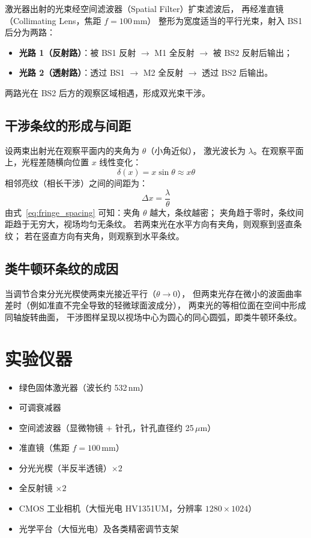 \documentclass[12pt, a4paper]{article}
\begin{document}
激光器出射的光束经空间滤波器（Spatial Filter）扩束滤波后，
再经准直镜（Collimating Lens，焦距 $f = 100\,\text{mm}$）
整形为宽度适当的平行光束，射入 BS1 后分为两路：
\begin{itemize}
  \item \textbf{光路 1（反射路）}：被 BS1 反射 $\to$ M1 全反射
        $\to$ 被 BS2 反射后输出；
  \item \textbf{光路 2（透射路）}：透过 BS1 $\to$ M2 全反射
        $\to$ 透过 BS2 后输出。
\end{itemize}
两路光在 BS2 后方的观察区域相遇，形成双光束干涉。

\subsection{干涉条纹的形成与间距}

设两束出射光在观察平面内的夹角为 $\theta$（小角近似），
激光波长为 $\lambda$。在观察平面上，光程差随横向位置 $x$ 线性变化：
\begin{equation}
  \delta(x) = x\sin\theta \approx x\theta
\end{equation}
相邻亮纹（相长干涉）之间的间距为：
\begin{equation}
  \Delta x = \frac{\lambda}{\theta}
  \label{eq:fringe_spacing}
\end{equation}
由式~\eqref{eq:fringe_spacing} 可知：夹角 $\theta$ 越大，条纹越密；
夹角趋于零时，条纹间距趋于无穷大，视场均匀无条纹。
若两束光在水平方向有夹角，则观察到竖直条纹；
若在竖直方向有夹角，则观察到水平条纹。

\subsection{类牛顿环条纹的成因}

当调节合束分光光楔使两束光接近平行（$\theta \to 0$），
但两束光存在微小的波面曲率差时（例如准直不完全导致的轻微球面波成分），
两束光的等相位面在空间中形成同轴旋转曲面，
干涉图样呈现以视场中心为圆心的同心圆弧，即类牛顿环条纹。

\section{实验仪器}

\begin{itemize}
  \item 绿色固体激光器（波长约 532\,nm）
  \item 可调衰减器
  \item 空间滤波器（显微物镜 + 针孔，针孔直径约 25\,$\mu$m）
  \item 准直镜（焦距 $f = 100\,\text{mm}$）
  \item 分光光楔（半反半透镜）$\times 2$
  \item 全反射镜 $\times 2$
  \item CMOS 工业相机（大恒光电 HV1351UM，分辨率 $1280 \times 1024$）
  \item 光学平台（大恒光电）及各类精密调节支架
\end{itemize}
\end{document}
